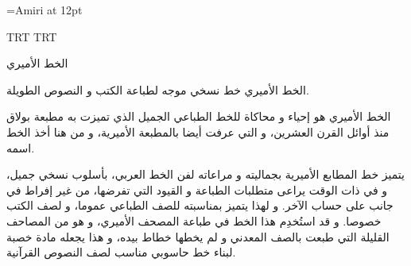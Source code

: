 \documentclass{article}
\begin{document}
\font\amiri={Amiri} at 12pt
\amiri
\startharfbuzz


\luatextextdir TRT
\luatexpardir TRT

الخط الأميري 

الخط الأميري خط نسخي موجه لطباعة الكتب و النصوص الطويلة.

الخط الأميري هو إحياء و محاكاة للخط الطباعي الجميل الذي تميزت به مطبعة بولاق منذ أوائل القرن العشرين، و التي عرفت أيضا بالمطبعة الأميرية، و من هنا أخذ الخط اسمه.

يتميز خط المطابع الأميرية بجماليته و مراعاته لفن الخط العربي، بأسلوب نسخي جميل، و في ذات الوقت يراعى متطلبات الطباعة و القيود التي تفرضها، من غير إفراط في جانب على حساب الآخر. و لهذا يتميز بمناسبته للصف الطباعي عموما، و لصف الكتب خصوصا. و قد استُخدِم هذا الخط في طباعة المصحف الأميري، و هو من المصاحف القليلة التي طبعت بالصف المعدني و لم يخطها خطاط بيده، و هذا يجعله مادة خصبة لبناء خط حاسوبي مناسب لصف النصوص القرآنية.
\end{document}
